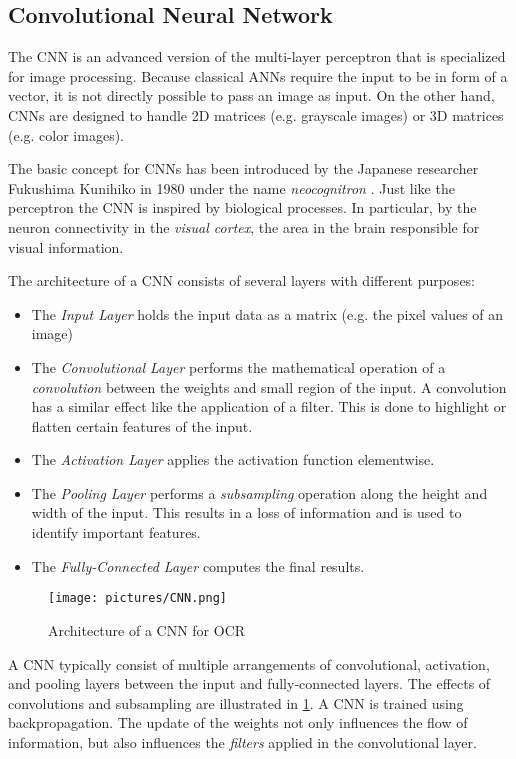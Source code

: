 \subsection{Convolutional Neural Network}
The \ac{CNN} is an advanced version of the multi-layer perceptron that is specialized for image processing. Because classical \acp{ANN} require the input to be in form of a vector, it is not directly possible to pass an image as input. On the other hand, \acp{CNN} are designed to handle 2D matrices (e.g. grayscale images) or 3D matrices (e.g. color images).
\cite{Goodfellow-et-al-2016}

The basic concept for \acp{CNN} has been introduced by the Japanese researcher Fukushima Kunihiko in 1980 under the name \textit{neocognitron} \cite{fukushima1980neocognitron}.
Just like the perceptron the \ac{CNN} is inspired by biological processes. In particular, by the neuron connectivity in the \textit{visual cortex}, the area in the brain responsible for visual information. 

The architecture of a \ac{CNN} consists of several layers with different purposes:
\begin{itemize}
    \item The \textit{Input Layer} holds the input data as a matrix (e.g. the pixel values of an image)
    \item The \textit{Convolutional Layer} performs the mathematical operation of a \textit{convolution} between the weights and small region of the input. A convolution has a similar effect like the application of a filter. This is done to highlight or flatten certain features of the input.
    \item The \textit{Activation Layer} applies the activation function elementwise.
    \item The \textit{Pooling Layer} performs a \textit{subsampling} operation along the height and width of the input. This results in a loss of information and is used to identify important features.
    \item The \textit{Fully-Connected Layer} computes the final results.
\end{itemize}
\begin{figure}[ht]
    \centering 
    \texttt{[image: pictures/CNN.png]}
    \caption{Architecture of a CNN for OCR \cite{lecun1998gradient}}
    \label{pic:CNN}    %
\end{figure}

A \ac{CNN} typically consist of multiple arrangements of convolutional, activation, and pooling layers between the input and fully-connected layers. The effects of convolutions and subsampling are illustrated in \cref{pic:CNN}. A \ac{CNN} is trained using backpropagation. The update of the weights not only influences the flow of information, but also influences the \textit{filters} applied in the convolutional layer.
\cite{fukushima1980neocognitron,lecun1998gradient,Goodfellow-et-al-2016}


